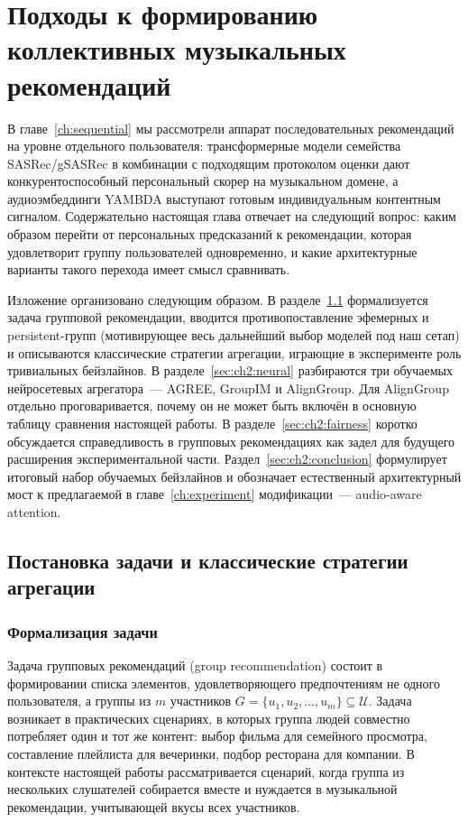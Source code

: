 \chapter{Подходы к формированию коллективных музыкальных рекомендаций}
\label{ch:groups}

В главе~\ref{ch:sequential} мы рассмотрели аппарат последовательных рекомендаций на уровне отдельного пользователя: трансформерные модели семейства SASRec/gSASRec в комбинации с подходящим протоколом оценки дают конкурентоспособный персональный скорер на музыкальном домене, а аудиоэмбеддинги YAMBDA выступают готовым индивидуальным контентным сигналом. Содержательно настоящая глава отвечает на следующий вопрос: каким образом перейти от персональных предсказаний к рекомендации, которая удовлетворит группу пользователей одновременно, и какие архитектурные варианты такого перехода имеет смысл сравнивать.

Изложение организовано следующим образом. В разделе~\ref{sec:ch2:setup} формализуется задача групповой рекомендации, вводится противопоставление эфемерных и persistent-групп (мотивирующее весь дальнейший выбор моделей под наш сетап) и описываются классические стратегии агрегации, играющие в эксперименте роль тривиальных бейзлайнов. В разделе~\ref{sec:ch2:neural} разбираются три обучаемых нейросетевых агрегатора~--- AGREE, GroupIM и AlignGroup. Для AlignGroup отдельно проговаривается, почему он не может быть включён в основную таблицу сравнения настоящей работы. В разделе~\ref{sec:ch2:fairness} коротко обсуждается справедливость в групповых рекомендациях как задел для будущего расширения экспериментальной части. Раздел~\ref{sec:ch2:conclusion} формулирует итоговый набор обучаемых бейзлайнов и обозначает естественный архитектурный мост к предлагаемой в главе~\ref{ch:experiment} модификации~--- audio-aware attention.

\section{Постановка задачи и классические стратегии агрегации}
\label{sec:ch2:setup}

\subsection{Формализация задачи}
\label{subsec:ch2:formal}

Задача групповых рекомендаций (group recommendation) состоит в формировании списка элементов, удовлетворяющего предпочтениям не одного пользователя, а группы из $m$ участников $G = \{u_1, u_2, \ldots, u_m\} \subseteq \mathcal{U}$. Задача возникает в практических сценариях, в которых группа людей совместно потребляет один и тот же контент: выбор фильма для семейного просмотра, составление плейлиста для вечеринки, подбор ресторана для компании. В контексте настоящей работы рассматривается сценарий, когда группа из нескольких слушателей собирается вместе и нуждается в музыкальной рекомендации, учитывающей вкусы всех участников.


